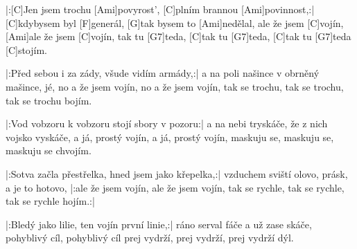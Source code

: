 
\sloka
|:[C]Jen jsem trochu [Ami]povyrost’, [C]plním brannou [Ami]povinnost,:|
[C]kdybysem byl [F]generál, [G]tak bysem to [Ami]nedělal,
ale že jsem [C]vojín, [Ami]ale že jsem [C]vojín,
tak tu [G7]teda, [C]tak tu [G7]teda, [C]tak tu [G7]teda [C]stojím.

\sloka
|:Před sebou i za zády, všude vidím armády,:|
a na poli našince v obrněný mašince, jé,
no a že jsem vojín, no a že jsem vojín,
tak se trochu, tak se trochu, tak se trochu bojím.

\sloka
|:Vod vobzoru k vobzoru stojí sbory v pozoru:|
a na nebi tryskáče, že z nich vojsko vyskáče,
a já, prostý vojín, a já, prostý vojín,
maskuju se, maskuju se, maskuju se chvojím.

\sloka
|:Sotva začla přestřelka, hned jsem jako křepelka,:|
vzduchem sviští olovo, prásk, a je to hotovo,
|:ale že jsem vojín, ale že jsem vojín,
tak se rychle, tak se rychle, tak se rychle hojím.:|

\sloka
|:Bledý jako lilie, ten vojín první linie,:|
ráno serval fáče a už zase skáče,
pohyblivý cíl, pohyblivý cíl
prej vydrží, prej vydrží, prej vydrží dýl.
